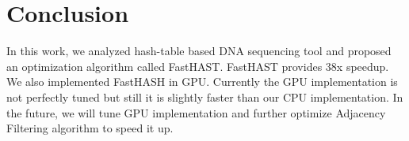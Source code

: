 \section{Conclusion} \label{sec:conclusion} 

In this work, we analyzed hash-table based DNA sequencing tool and proposed an
optimization algorithm called FastHAST. FastHAST provides 38x speedup. We also
implemented FastHASH in GPU. Currently the GPU implementation is not perfectly
tuned but still it is slightly faster than our CPU implementation. In the
future, we will tune GPU implementation and further optimize Adjacency
Filtering algorithm to speed it up.\\
